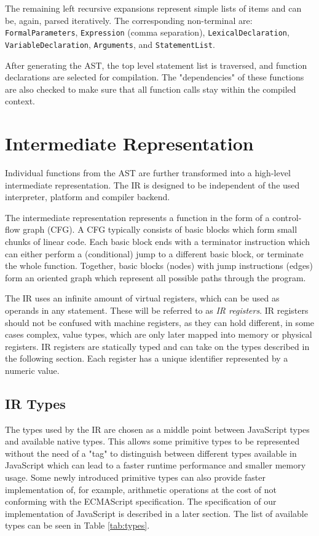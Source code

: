 The remaining left recursive expansions represent simple lists of items and can be, again, parsed iteratively. The corresponding non-terminal are: \texttt{FormalParameters}, \texttt{Expression} (comma separation), \texttt{LexicalDeclaration}, \texttt{VariableDeclaration}, \texttt{Arguments}, and \texttt{StatementList}.

After generating the AST, the top level statement list is traversed, and function declarations are selected for compilation. The "dependencies" of these functions are also checked to make sure that all function calls stay within the compiled context.


\section{Intermediate Representation}

Individual functions from the AST are further transformed into a high-level intermediate representation. The IR is designed to be independent of the used interpreter, platform and compiler backend.

The intermediate representation represents a function in the form of a control-flow graph (CFG). A CFG typically consists of basic blocks which form small chunks of linear code. Each basic block ends with a terminator instruction which can either perform a (conditional) jump to a different basic block, or terminate the whole function. Together, basic blocks (nodes) with jump instructions (edges) form an oriented graph which represent all possible paths through the program.

The IR uses an infinite amount of virtual registers, which can be used as operands in any statement. These will be referred to as \textit{IR registers}. IR registers should not be confused with machine registers, as they can hold different, in some cases complex, value types, which are only later mapped into memory or physical registers. IR registers are statically typed and can take on the types described in the following section. Each register has a unique identifier represented by a numeric value.



\subsection{IR Types}

The types used by the IR are chosen as a middle point between JavaScript types and available native types. This allows some primitive types to be represented without the need of a "tag" to distinguish between different types available in JavaScript which can lead to a faster runtime performance and smaller memory usage. Some newly introduced primitive types can also provide faster implementation of, for example, arithmetic operations at the cost of not conforming with the ECMAScript specification. The specification of our implementation of JavaScript is described in a later section. The list of available types can be seen in Table \ref{tab:types}.

